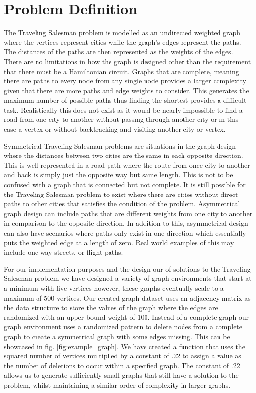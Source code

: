 \documentclass[sigplan,screen]{acmart}
\begin{document}
\section{Problem Definition}
The Traveling Salesman problem is modelled as an undirected weighted graph where
the vertices represent cities while the graph’s edges represent the paths. The
distances of the paths are then represented as the weights of the edges. There
are no limitations in how the graph is designed other than the requirement that
there must be a Hamiltonian circuit. Graphs that are complete, meaning there are
paths to every node from any single node provides a larger complexity given that
there are more paths and edge weights to consider. This generates the maximum
number of possible paths thus finding the shortest provides a difficult task.
Realistically this does not exist as it would be nearly impossible to find a
road from one city to another without passing through another city or in this
case a vertex or without backtracking and visiting another city or vertex.

Symmetrical Traveling Salesman problems are situations in the graph design where
the distances between two cities are the same in each opposite direction. This
is well represented in a road path where the route from once city to another and
back is simply just the opposite way but same length. This is not to be confused
with a graph that is connected but not complete. It is still possible for the
Traveling Salesman problem to exist where there are cities without direct paths
to other cities that satisfies the condition of the problem. Asymmetrical graph
design can include paths that are different weights from one city to another in
comparison to the opposite direction. In addition to this, asymmetrical design
can also have scenarios where paths only exist in one direction which
essentially puts the weighted edge at a length of zero. Real world examples of
this may include one-way streets, or flight paths.

For our implementation purposes and the design our of solutions to the Traveling
Salesman problem we have designed a variety of graph environments that start at
a minimum with five vertices however, these graphs eventually scale to a maximum
of 500 vertices. Our created graph dataset uses an adjacency matrix as the data
structure to store the values of the graph where the edges are randomized with
an upper bound weight of 100. Instead of a complete graph our graph environment
uses a randomized pattern to delete nodes from a complete graph to create a
symmetrical graph with some edges missing. This can be showcased in fig.
\ref{fig:example_graph}. We have created a function that uses the squared
number of vertices multiplied by a constant of .22 to assign a value as the
number of deletions to occur within a specified graph. The constant of .22
allows us to generate sufficiently small graphs that still have a solution to
the problem, whilst maintaining a similar order of complexity in larger graphs.
\end{document}
